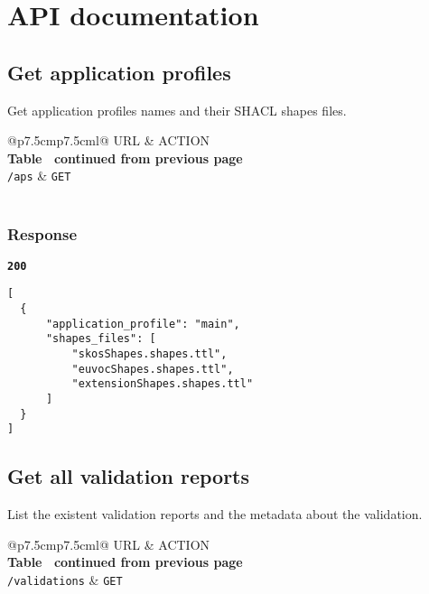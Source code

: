 \section{API documentation}

\subsection{Get application profiles}
\label{api:get-aps}
Get application profiles names and their SHACL shapes files.

\begin{longtable}[c]{@{}p{7.5cm}p{7.5cm}l@{}}
  \toprule
  URL           & ACTION                                      \\* \midrule
  \endfirsthead
  \multicolumn{3}{c}%
  {{\bfseries Table \thetable\ continued from previous page}} \\
  \endhead
  \bottomrule
  \endfoot
  \endlastfoot
  \texttt{/aps} & \texttt{GET}                                \\* \bottomrule
  \label{tab:rdf-validator-get-aps}                           \\
\end{longtable}

\subsubsection{Response}
\textbf{\texttt{200}}
\begin{lstlisting}
[
  {
      "application_profile": "main",
      "shapes_files": [
          "skosShapes.shapes.ttl",
          "euvocShapes.shapes.ttl",
          "extensionShapes.shapes.ttl"
      ]
  }
]
\end{lstlisting}

\subsection{Get all validation reports}
List the existent validation reports and the metadata about the validation.

\begin{longtable}[c]{@{}p{7.5cm}p{7.5cm}l@{}}
  \toprule
  URL                   & ACTION                              \\* \midrule
  \endfirsthead
  \multicolumn{3}{c}%
  {{\bfseries Table \thetable\ continued from previous page}} \\
  \endhead
  \bottomrule
  \endfoot
  \endlastfoot
  \texttt{/validations} & \texttt{GET}                        \\* \bottomrule
  \label{tab:rdf-validator-all-validations}                   \\
\end{longtable}

